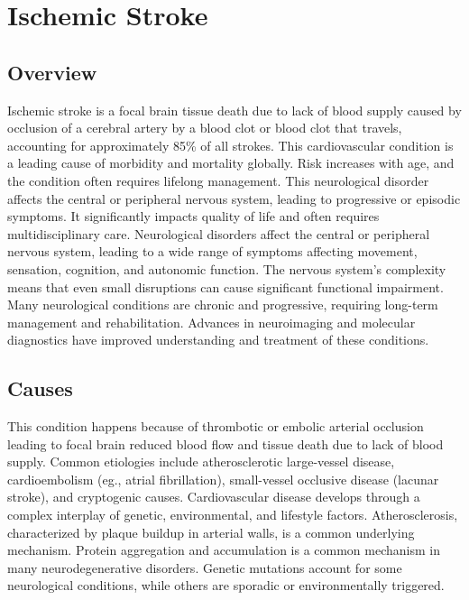 \chapter{Ischemic Stroke}
\label{sec:Ischemic Stroke}

\section{Overview}
Ischemic stroke is a focal brain tissue death due to lack of blood supply caused by occlusion of a cerebral artery by a blood clot or blood clot that travels, accounting for approximately 85\% of all strokes. This cardiovascular condition is a leading cause of morbidity and mortality globally. Risk increases with age, and the condition often requires lifelong management. This neurological disorder affects the central or peripheral nervous system, leading to progressive or episodic symptoms. It significantly impacts quality of life and often requires multidisciplinary care. Neurological disorders affect the central or peripheral nervous system, leading to a wide range of symptoms affecting movement, sensation, cognition, and autonomic function. The nervous system's complexity means that even small disruptions can cause significant functional impairment. Many neurological conditions are chronic and progressive, requiring long-term management and rehabilitation. Advances in neuroimaging and molecular diagnostics have improved understanding and treatment of these conditions.
\section{Causes}
This condition happens because of thrombotic or embolic arterial occlusion leading to focal brain reduced blood flow and tissue death due to lack of blood supply. Common etiologies include atherosclerotic large-vessel disease, cardioembolism (eg., atrial fibrillation), small-vessel occlusive disease (lacunar stroke), and cryptogenic causes. Cardiovascular disease develops through a complex interplay of genetic, environmental, and lifestyle factors. Atherosclerosis, characterized by plaque buildup in arterial walls, is a common underlying mechanism.    Protein aggregation and accumulation is a common mechanism in many neurodegenerative disorders.  Genetic mutations account for some neurological conditions, while others are sporadic or environmentally triggered.   
